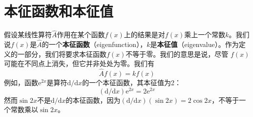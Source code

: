 \section{本征函数和本征值}
\label{sec:3.2 Eigenfunctions and Eigenvalues}
	假设某线性算符$\hat{A}$作用在某个函数$f\left(x\right)$上的结果是对$f\left(x\right)$乘上一个常数$k$。我们说$f\left(x\right)$是$\hat{A}$的一个\textbf{本征函数}（eigenfunction），$k$是\textbf{本征值}（eigenvalue）。作为定义的一部分，我们将要求本征函数$f\left(x\right)$不等于零。我们的意思是说，尽管 $f\left(x\right)$ 可能在不同点上消失，但它并非处处为零。我们有
	\begin{equation}
		\boxed{
			\hat{A}f\left(x\right) = kf\left(x\right)
		}
		\label{eq:3.14 definition of eigenfunctions and eigenvalues}
	\end{equation}
	例如，函数$\mathrm{e}^{2x}$是算符$\mathrm{d}/\mathrm{d}x$的一个本征函数，其本征值为2：
	\begin{equation*}
		\left(\mathrm{d}/\mathrm{d}x\right)\mathrm{e}^{2x} = 2 \mathrm{e}^{2x}
	\end{equation*}
	然而$\sin 2x$不是$\mathrm{d}/\mathrm{d}x$的本征函数，因为$\left(\mathrm{d}/\mathrm{d}x\right)\left(\sin 2x\right) = 2 \cos 2x$，不等于一个常数乘以$\sin 2x$。
